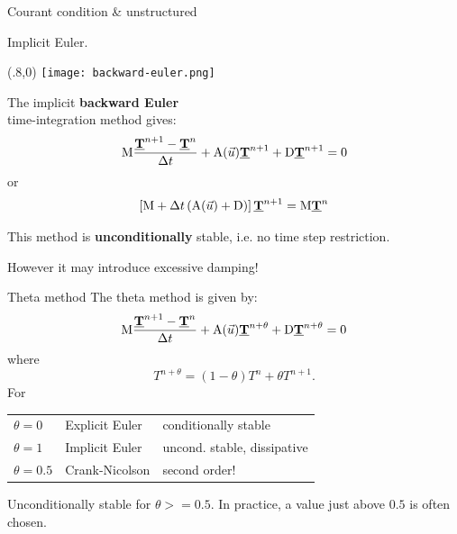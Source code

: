 \documentclass[12pt]{beamer}
\newcommand\mat[1]{\mathrm{#1}}
\newcommand\dv[1]{\underline{\bf #1}} %
\newcommand\vT{\dv T}
\renewcommand\emph[1]{{\bf #1}}
\begin{document}
\begin{frame}{Courant condition \& unstructured}
\begin{example}
\begin{minipage}{0.3\textwidth}
  \end{minipage}

\end{example}
\end{frame}

\begin{frame}{Implicit Euler\hspace{10ex}.}
  \begin{textblock}{0.3}(.8,0)
     \texttt{[image: backward-euler.png]}
  \end{textblock}
  \begin{minipage}{0.7\textwidth}
  The implicit \emph{backward Euler} \\
  time-integration method gives:
  \begin{equation*}
    \mat M\frac{\vT^{n+1}-\vT^n}{\Delta t} 
    + \mat A(\vec u) \vT^{n+1} + \mat D \vT^{n+1} = 0
  \end{equation*}
  or
  \begin{equation*}
    \left[ \mat M + \Delta t\left(\mat A(\vec u) + \mat D\right) \right] \vT^{n+1} = \mat M \vT^n 
  \end{equation*}
  \end {minipage}

  \vspace{1ex}
  This method is \emph{unconditionally} stable, i.e. no time step restriction.

  \vspace{1em}
  However it may introduce excessive damping!
\end{frame}

\begin{frame}{Theta method}
  The theta method is given by:
  \begin{equation*}
    \mat M\frac{\vT^{n+1}-\vT^n}{\Delta t} 
    + \mat A(\vec u) \vT^{n+\theta} + \mat D
    \vT^{n+\theta} = 0
  \end{equation*}
  where
  \begin{equation*}
    T^{n+\theta}=(1-\theta) T^n + \theta T^{n+1}.
  \end{equation*}
  For %
  \begin{tabular}{lll}
    $\theta=0$ & Explicit Euler & conditionally stable \\
    $\theta=1$ & Implicit Euler & uncond. stable, dissipative\hspace{-4em}\;\\
    $\theta=0.5$ & Crank-Nicolson & second order!
  \end{tabular}

  \vspace{1em}
  Unconditionally stable for $\theta>=0.5$. In practice, a value just above
  $0.5$ is often chosen.
\end{frame}
\end{document}
